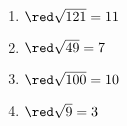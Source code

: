     \phantom{rrr}

    \begin{multicols}{2}
        \begin{enumerate}
            \item ${\red\sqrt{121}=11}$
            \item ${\red\sqrt{49}=7}$
            \item ${\red\sqrt{100}=10}$
            \item ${\red\sqrt{9}=3}$
        \end{enumerate}
    \end{multicols}

